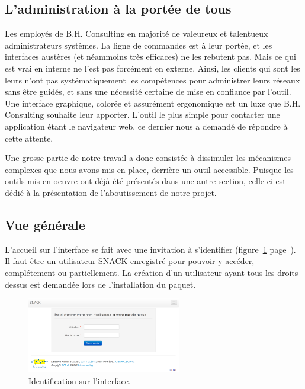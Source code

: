 \subsection{L'administration à la portée de tous}

Les employés de B.H. Consulting en majorité de valeureux et talentueux administrateurs systèmes. La ligne de commandes est à leur portée, et les interfaces austères (et néammoins très efficaces) ne les rebutent pas. Mais ce qui est vrai en interne ne l'est pas forcément en externe. Ainsi, les clients qui sont les leurs n'ont pas systématiquement les compétences pour administrer leurs réseaux sans être guidés, et sans une nécessité certaine de mise en confiance par l'outil. Une interface graphique, colorée et assurément ergonomique est un luxe que B.H. Consulting souhaite leur apporter. L'outil le plus simple pour contacter une application étant le navigateur web, ce dernier nous a demandé de répondre à cette attente.

Une grosse partie de notre travail a donc consistée à dissimuler les mécanismes complexes que nous avons mis en place, derrière un outil accessible. Puisque les outils mis en oeuvre ont déjà été présentés dans une autre section, celle-ci est dédié à la présentation de l'aboutissement de notre projet.

\subsection{Vue générale}

L'accueil sur l'interface se fait avec une invitation à s'identifier (figure~\ref{login} page~\pageref{login}). Il faut être un utilisateur SNACK enregistré pour pouvoir y accéder, complétement ou partiellement. La création d'un utilisateur ayant tous les droits dessus est demandée lors de l'installation du paquet.

\begin{figure}[!h]
	\begin{center}
	    \includegraphics[width=0.6\textwidth]{img/login.png}
	\end{center}
	\caption{Identification sur l'interface.}
	\label{login}
\end{figure}

